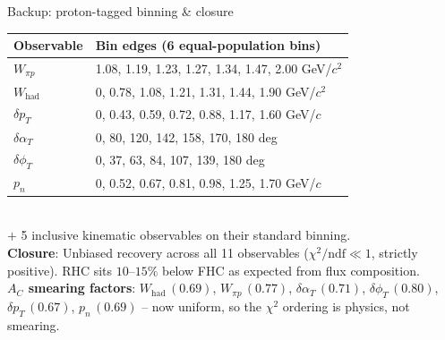 \documentclass[aspectratio=169,10pt]{beamer}
\begin{document}
{\begin{frame}{Backup: proton-tagged binning \& closure}
  \centering\footnotesize
  \begin{tabular}{ll}
  \toprule Observable & Bin edges (6 equal-population bins)\\\midrule
  $W_{\pi p}$ & 1.08, 1.19, 1.23, 1.27, 1.34, 1.47, 2.00 GeV/$c^2$\\
  $W_\mathrm{had}$ & 0, 0.78, 1.08, 1.21, 1.31, 1.44, 1.90 GeV/$c^2$\\
  $\delta p_T$ & 0, 0.43, 0.59, 0.72, 0.88, 1.17, 1.60 GeV/$c$\\
  $\delta\alpha_T$ & 0, 80, 120, 142, 158, 170, 180 deg\\
  $\delta\phi_T$ & 0, 37, 63, 84, 107, 139, 180 deg\\
  $p_n$ & 0, 0.52, 0.67, 0.81, 0.98, 1.25, 1.70 GeV/$c$\\
  \bottomrule
  \end{tabular}\\[2mm]
  {\scriptsize $+$ 5 inclusive kinematic observables on their standard binning.\\[1mm]
  \textbf{Closure}: Unbiased recovery across all 11 observables ($\chi^2/\mathrm{ndf} \ll 1$, strictly positive). RHC sits $10\text{--}15\%$ below FHC as expected from flux composition.}\\[1mm]
  {\scriptsize\textbf{$A_C$ smearing factors}: $W_\mathrm{had}\,(0.69)$, $W_{\pi p}\,(0.77)$, $\delta\alpha_T\,(0.71)$, $\delta\phi_T\,(0.80)$, $\delta p_T\,(0.67)$, $p_n\,(0.69)$ -- now \alert{uniform}, so the $\chi^2$ ordering is physics, not smearing.}
\end{frame}

}
\end{document}
